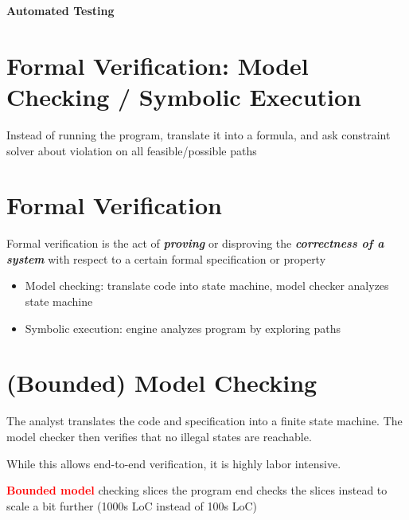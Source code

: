 \documentclass[11pt]{article}
\begin{document}
\begin{center}
  {\LARGE \textbf{Automated Testing}}
\end{center}
\vspace{0.5cm}

\section*{Formal Verification: Model Checking / Symbolic Execution}

\begin{tcolorbox}[
  colback=yellow!15,     %
  colframe=black!50,    %
  boxrule=1pt,       %
  arc=3mm,             %
  left=4mm, right=4mm, top=2mm, bottom=2mm %
]
Instead of running the program, translate it into a formula, and ask constraint solver about violation on all feasible/possible paths
\end{tcolorbox}

\section*{Formal Verification}

Formal verification is the act of \textbf{\textit{proving}} or disproving the \textbf{\textit{correctness of a system}} with respect to a certain formal specification or property

\begin{itemize}
	\item Model checking: translate code into state machine, model checker analyzes state machine
	\item Symbolic execution: engine analyzes program by exploring paths
\end{itemize}

\section*{(Bounded) Model Checking}

The analyst translates the code and specification into a finite state machine. The model checker then verifies that no illegal states are reachable. 

While this allows end-to-end verification, it is highly labor intensive. 

\textcolor{red}{\textbf{Bounded model}} checking slices the program end checks the slices instead to scale a bit further (1000s LoC instead of 100s LoC)
\end{document}
